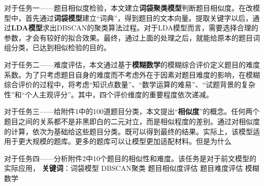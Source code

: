对于任务一——题目相似度检验，本文建立\textbf{词袋聚类模型}判断题目相似度。在改模型中，首先通过\textbf{词袋模型}建立“词典”，得到题目的文本向量。提取关键字以后，通过\textbf{LDA模型}求出DBSCAN的聚类算法过程。对于LDA模型而言，需要选择合理的参数，才会有较好的拟合效果。最终，通过上面的处理之后，就能给原本的题目词组分类，已达到相似检验的目的。

对于任务二——难度评估，本文通过基于\textbf{模糊数学}的模糊综合评价定义题目的难度系数。为了只考虑题目自身的难度而不考虑外在于因素对题目难度的影响，在模糊综合评价的过程中，将考虑“知识点数量”、“数学运算的难易”、“试题背景的复杂性”和“个人主观评分”。其中，四个评价维度的重要程度依次递减。

对于任务三——给附件1中的100道题目分类，本文提出“\textbf{相似度}”的概念。任何两个题目之间的关系都不是非黑即白的二元对立，而是相似程度的差别。通过对相似度的计算，依次为基础给这些题目分类。既可以得到最终的结果。实际上，该模型适用于更大规模的题库。更多的题库可以让模型更加适配材料。但是为什么

对于任务四——分析附件2中10个题目的相似性和难度。该任务是对于前文模型的实际应用，
\newline
\newline
\textbf{关键词}：词袋模型 \quad DBSCAN聚类 \quad 题目相似度评估 \quad 题目难度评估 \quad 模糊数学

\newpage
\thispagestyle{empty}
\tableofcontents